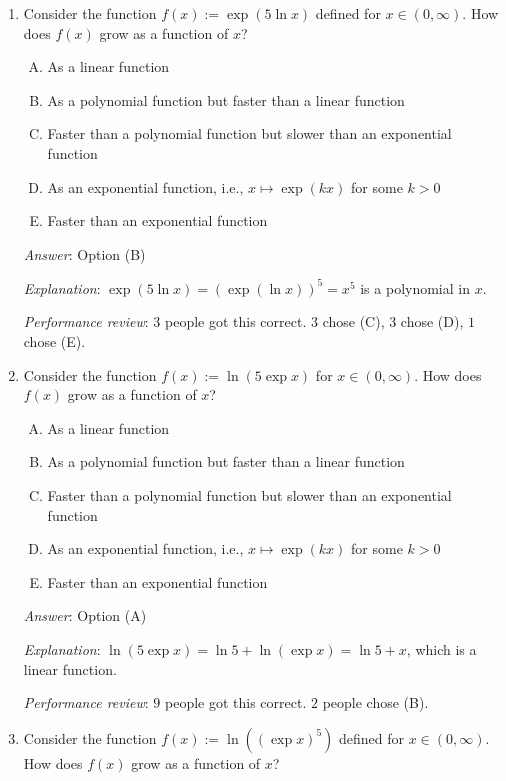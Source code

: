 \documentclass[10pt]{amsart}
\begin{document}
\begin{enumerate}
\item Consider the function $f(x) := \exp(5 \ln x)$ defined for $x \in
  (0,\infty)$. How does $f(x)$ grow as a function of $x$?

  \begin{enumerate}[(A)]
  \item As a linear function
  \item As a polynomial function but faster than a linear function
  \item Faster than a polynomial function but slower than an
    exponential function
  \item As an exponential function, i.e., $x \mapsto \exp(kx)$ for some $k > 0$
  \item Faster than an exponential function
  \end{enumerate}

  {\em Answer}: Option (B)

  {\em Explanation}: $\exp(5 \ln x) = (\exp (\ln x))^5 = x^5$ is a
  polynomial in $x$.

  {\em Performance review}: $3$ people got this correct. $3$ chose
  (C), $3$ chose (D), $1$ chose (E).
\item Consider the function $f(x) := \ln (5 \exp x)$ for $x \in
  (0,\infty)$. How does $f(x)$ grow as a function of $x$?

  \begin{enumerate}[(A)]
  \item As a linear function
  \item As a polynomial function but faster than a linear function
  \item Faster than a polynomial function but slower than an
    exponential function
  \item As an exponential function, i.e., $x \mapsto \exp(kx)$ for some $k > 0$
  \item Faster than an exponential function
  \end{enumerate}

  {\em Answer}: Option (A)

  {\em Explanation}: $\ln(5 \exp x) = \ln 5 + \ln(\exp x) = \ln 5 +
  x$, which is a linear function.

  {\em Performance review}: $9$ people got this correct. $2$ people
  chose (B).
\item Consider the function $f(x) := \ln((\exp x)^5)$ defined for $x \in
  (0,\infty)$. How does $f(x)$ grow as a function of $x$?


\end{enumerate}
\end{document}
